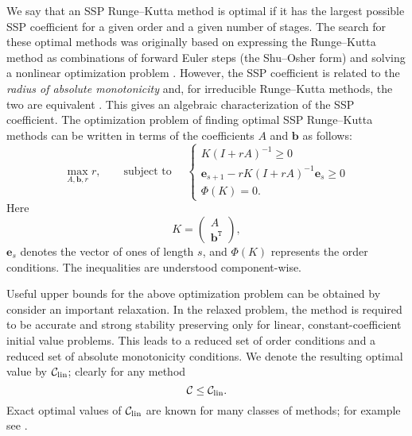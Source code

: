 We say that an SSP Runge--Kutta method is optimal if it has the largest possible SSP coefficient for a given order and a given number of stages.
The search for these optimal methods was originally based on
expressing the Runge--Kutta method as combinations of forward Euler
steps (the Shu--Osher form) and solving a nonlinear optimization
problem \cite{Gottlieb1998, Gottlieb2001, Spiteri2003a, Spiteri2003b,
  Ruuth2004, Ruuth:baron}.
However, the SSP coefficient is related to the \emph{radius of absolute monotonicity} \cite{Kraaijevanger1991} and, for irreducible Runge--Kutta methods, the two are equivalent \cite{Ferracina2004, Higueras2004}.
This gives an algebraic characterization of the SSP coefficient.
The optimization problem of finding optimal SSP Runge--Kutta methods
can be written in terms of the coefficients $A$ and $\bm{b}$ as
follows:
\begin{equation}\label{eq:SSP_opt}
    \max_{A, \bm{b}, r} r, \qquad \text{subject to } \quad \left\{
                                                 \begin{array}{ll}
                                                   K(I + rA)^{-1} \geq 0 \\
                                                   \bm{e}_{s+1} - rK(I + rA)^{-1}\bm{e}_{s} \geq 0 \\
                                                   \Phi(K) = 0.
                                                 \end{array}
                                               \right.
\end{equation}
Here
\begin{equation*}
    K = \left(
            \begin{array}{c}
                     A              \\
                     \bm{b}^{\texttt{T}}
            \end{array}
         \right),
\end{equation*}
$\bm{e}_s$ denotes the vector of ones of length $s$,
and \( \Phi(K) \) represents the  order conditions.
The inequalities are understood component-wise.

Useful upper bounds for the above optimization problem can be obtained by consider an important relaxation. 
In the relaxed problem, the method is required to be accurate and strong stability preserving only for linear, constant-coefficient initial value problems. 
This leads to a reduced set of order conditions and a reduced set of absolute monotonicity conditions.
We denote the resulting optimal value by $\mathcal{C}_{\text{lin}}$; clearly for any method
\begin{equation*}
	\mathcal{C}\le\mathcal{C}_{\text{lin}}.
\end{equation*}
Exact optimal values of $\mathcal{C}_{\text{lin}}$ are known for many classes of methods; for example see \cite{Kraaijevanger1986,ketcheson2009a}.


